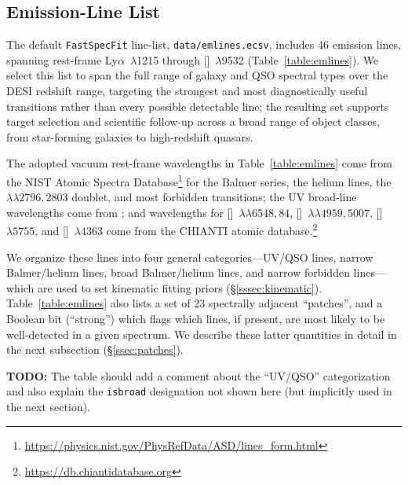 \documentclass[modern,linenumbers]{aastex701}
\newcommand{\todo}[1]{{\color{red}\textbf{TODO:} #1}}
\newcommand{\fastspecfit}{\texttt{FastSpecFit}}
\newcommand{\oiii}{[\ion{O}{3}]}
\newcommand{\nii}{[\ion{N}{2}]}
\newcommand{\mgiidoublet}{\ion{Mg}{2}~$\lambda\lambda2796,2803$}
\newcommand{\oiiidoublet}{[\ion{O}{3}]~$\lambda\lambda4959,5007$}
\newcommand{\niidoublet}{[\ion{N}{2}]~$\lambda\lambda6548,84$}
\begin{document}
%

\subsection{Emission-Line List}
\label{ssec:emlinelist}

The default \fastspecfit{} line-list, \texttt{data/emlines.ecsv},
includes 46 emission lines, spanning rest-frame
Ly$\alpha$~$\lambda$1215 through []~$\lambda$9532
(Table~\ref{table:emlines}). We select this list to span the full range
of galaxy and QSO spectral types over the DESI redshift range,
targeting the strongest and most diagnostically useful transitions
rather than every possible detectable line; the resulting set supports
target selection and scientific follow-up across a broad range of
object classes, from star-forming galaxies to high-redshift
quasars.

The adopted vacuum rest-frame wavelengths in Table~\ref{table:emlines}
come from the NIST Atomic Spectra
Database\footnote{\url{https://physics.nist.gov/PhysRefData/ASD/lines_form.html}}
for the Balmer series, the helium lines, the \mgiidoublet{} doublet,
and most forbidden transitions; the UV broad-line wavelengths come
from \citet{vanden-berk01a}; and wavelengths for \niidoublet,
\oiiidoublet, \nii~$\lambda5755$, and \oiii~$\lambda4363$ come from
the CHIANTI atomic
database.\footnote{\url{https://db.chiantidatabase.org}}

We organize these lines into four general categories---UV/QSO lines,
narrow Balmer/helium lines, broad Balmer/helium lines, and narrow
forbidden lines---which are used to set kinematic fitting priors
(\S\ref{sssec:kinematic}). Table~\ref{table:emlines} also lists a set
of 23 spectrally adjacent ``patches'', and a Boolean bit (``strong'')
which flags which lines, if present, are most likely to be
well-detected in a given spectrum. We describe these latter quantities
in detail in the next subsection (\S\ref{ssec:patches}).

\todo{The table should add a comment about the ``UV/QSO''
  categorization and also explain the \texttt{isbroad} designation not
  shown here (but implicitly used in the next section).}



\end{document}
